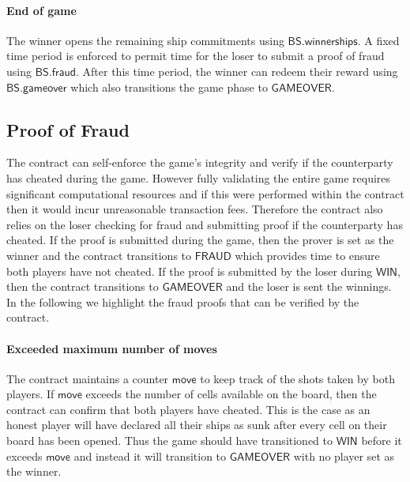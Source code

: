 \documentclass{llncs}
\newcommand{\instantiatedno}{\mathsf{NO}}
\newcommand{\instantiatedyes}{\mathsf{YES}}
\newcommand{\gamewinner}{\mathsf{WIN}}
\newcommand{\gamefraud}{\mathsf{FRAUD}}
\newcommand{\gamefinished}{\mathsf{GAMEOVER}}
\newcommand{\hshiplocation}{\mathsf{hshiplocation}}
\newcommand{\participant}{\mathcal{P}}
\newcommand{\sign}{\mathsf{Sign}}
\newcommand{\battleshipfraud}{\mathsf{BS.fraud}}
\newcommand{\battleshiprevealships}{\mathsf{BS.winnerships}}
\newcommand{\battleshipgameover}{\mathsf{BS.gameover}}
\newcommand{\appcontract}{\mathsf{AC}}
\begin{document}
\paragraph{End of game} 

The winner opens the remaining ship commitments using $\battleshiprevealships$.
A fixed time period is enforced to permit time for the loser to submit a proof of fraud using $\battleshipfraud$.
After this time period, the winner can redeem their reward using $\battleshipgameover$ which also transitions the game phase to $\gamefinished$. 


\subsection{Proof of Fraud} \label{sec:fraud}


The contract can self-enforce the game's integrity and verify if the counterparty has cheated during the game.
However fully validating the entire game requires significant computational resources and if this were performed within the contract then it would incur unreasonable transaction fees. 
Therefore the contract also relies on the loser checking for fraud and submitting proof if the counterparty has cheated. 
If the proof is submitted during the game, then the prover is set as the winner and the contract transitions to $\gamefraud$ which provides time to ensure both players have not cheated. 
If the proof is submitted by the loser during $\gamewinner$, then the contract transitions to $\gamefinished$ and the loser is sent the winnings.
In the following we highlight the fraud proofs that can be verified by the contract. 


\paragraph{Exceeded maximum number of moves} 
The contract maintains a counter $\mathsf{move}$ to keep track of the shots taken by both players. 
If $\mathsf{move}$ exceeds the number of cells available on the board, then the contract can confirm that both players have cheated.
This is the case as an honest player will have declared all their ships as sunk after every cell on their board has been opened.
Thus the game should have transitioned to $\gamewinner$ before it exceeds $\mathsf{move}$ and instead it will transition to $\gamefinished$ with no player set as the winner. 
\end{document}
